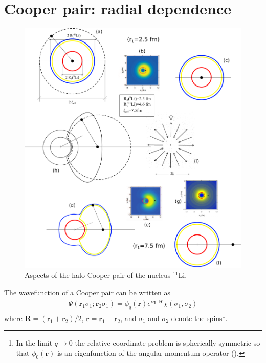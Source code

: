 \section{Cooper pair: radial dependence}\label{App3B}
  \begin{figure}
  	\centerline{\includegraphics*[width=15cm,angle=0	]{nutshell/figs/Fig3B1}}
  	\caption{Aspects of the halo Cooper pair of the nucleus $^{11}$Li.}\label{fig3B1}
  \end{figure}
The wavefunction of a Cooper pair  can be written as
\begin{align}\label{eq3B1}
\Psi(\mathbf r_1\sigma_1;\mathbf r_2\sigma_1)=\phi_q(\mathbf r)e^{i\mathbf q\cdot\mathbf R}\chi(\sigma_1,\sigma_2)
\end{align}
where $\mathbf R=(\mathbf r_1+\mathbf r_2)/2$, $\mathbf r=\mathbf r_1-\mathbf r_2$, and $\sigma_1$ and $\sigma_2$ denote the spins\footnote{In the limit $q\rightarrow 0$ the relative coordinate problem is spherically symmetric so that $\phi_0(\mathbf r)$ is an eigenfunction of the angular momentum operator (\cite{Schrieffer:64}).}. 


